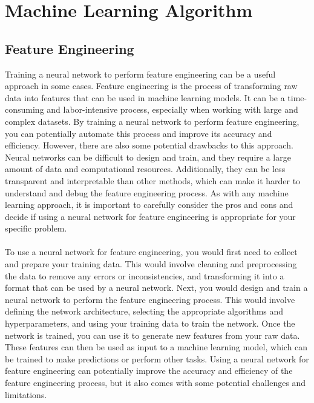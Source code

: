 \documentclass{report}
\begin{document}
\section{Machine Learning Algorithm}
\subsection{Feature Engineering}
Training a neural network to perform feature engineering can be a useful approach in some cases. Feature engineering is the process of transforming raw data into features that can be used in machine learning models. It can be a time-consuming and labor-intensive process, especially when working with large and complex datasets. By training a neural network to perform feature engineering, you can potentially automate this process and improve its accuracy and efficiency. However, there are also some potential drawbacks to this approach. Neural networks can be difficult to design and train, and they require a large amount of data and computational resources. Additionally, they can be less transparent and interpretable than other methods, which can make it harder to understand and debug the feature engineering process. As with any machine learning approach, it is important to carefully consider the pros and cons and decide if using a neural network for feature engineering is appropriate for your specific problem.\\
\\
To use a neural network for feature engineering, you would first need to collect and prepare your training data. This would involve cleaning and preprocessing the data to remove any errors or inconsistencies, and transforming it into a format that can be used by a neural network. Next, you would design and train a neural network to perform the feature engineering process. This would involve defining the network architecture, selecting the appropriate algorithms and hyperparameters, and using your training data to train the network. Once the network is trained, you can use it to generate new features from your raw data. These features can then be used as input to a machine learning model, which can be trained to make predictions or perform other tasks. Using a neural network for feature engineering can potentially improve the accuracy and efficiency of the feature engineering process, but it also comes with some potential challenges and limitations.\\
\end{document}
